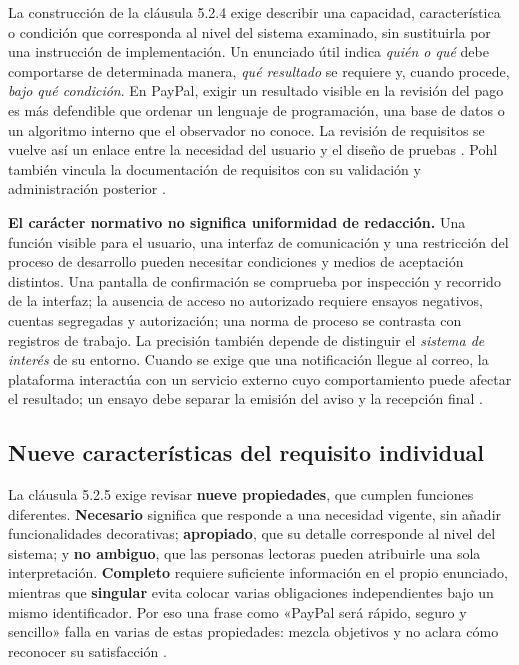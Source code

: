 \documentclass[10pt,a4paper]{extarticle}
\begin{document}
La construcción de la cláusula 5.2.4 exige describir una capacidad, característica o condición que corresponda al nivel del sistema examinado, sin sustituirla por una instrucción de implementación. Un enunciado útil indica \emph{quién o qué} debe comportarse de determinada manera, \emph{qué resultado} se requiere y, cuando procede, \emph{bajo qué condición}. En PayPal, exigir un resultado visible en la revisión del pago es más defendible que ordenar un lenguaje de programación, una base de datos o un algoritmo interno que el observador no conoce. La revisión de requisitos se vuelve así un enlace entre la necesidad del usuario y el diseño de pruebas \cite[cláusula 5.2.4]{iso29148}. Pohl también vincula la documentación de requisitos con su validación y administración posterior \cite{pohl2025}.

\textbf{El carácter normativo no significa uniformidad de redacción.} Una función visible para el usuario, una interfaz de comunicación y una restricción del proceso de desarrollo pueden necesitar condiciones y medios de aceptación distintos. Una pantalla de confirmación se comprueba por inspección y recorrido de la interfaz; la ausencia de acceso no autorizado requiere ensayos negativos, cuentas segregadas y autorización; una norma de proceso se contrasta con registros de trabajo. La precisión también depende de distinguir el \emph{sistema de interés} de su entorno. Cuando se exige que una notificación llegue al correo, la plataforma interactúa con un servicio externo cuyo comportamiento puede afectar el resultado; un ensayo debe separar la emisión del aviso y la recepción final \cite[cláusulas 5.2.4 y 5.2.8.3]{iso29148}.

\subsection{Nueve características del requisito individual}
La cláusula 5.2.5 exige revisar \textbf{nueve propiedades}, que cumplen funciones diferentes. \textbf{Necesario} significa que responde a una necesidad vigente, sin añadir funcionalidades decorativas; \textbf{apropiado}, que su detalle corresponde al nivel del sistema; y \textbf{no ambiguo}, que las personas lectoras pueden atribuirle una sola interpretación. \textbf{Completo} requiere suficiente información en el propio enunciado, mientras que \textbf{singular} evita colocar varias obligaciones independientes bajo un mismo identificador. Por eso una frase como «PayPal será rápido, seguro y sencillo» falla en varias de estas propiedades: mezcla objetivos y no aclara cómo reconocer su satisfacción \cite[cláusula 5.2.5]{iso29148}.
\end{document}
